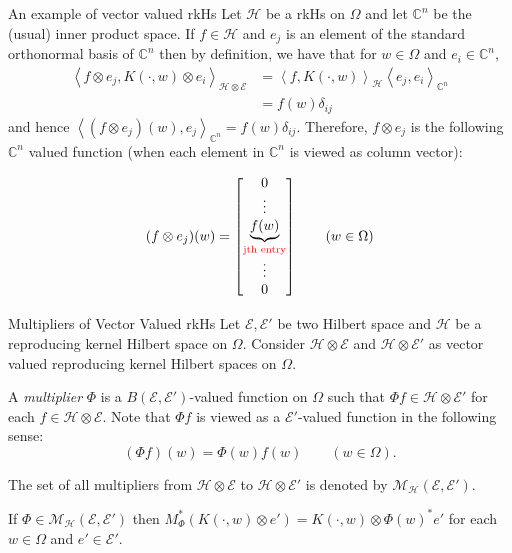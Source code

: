 \documentclass[handout]{beamer}
\newcommand{\C}{\mathbb C}
\newcommand{\calE}{{\mathcal E}}
\newcommand{\calH}{{\mathcal H}}
\newcommand{\calM}{{\mathcal M}}
\newcommand{\ip}[1]{\left\langle #1 \right\rangle}
\begin{document}
\begin{frame}{An example of vector valued rkHs}
Let $\calH$ be a rkHs on $\Omega$ and let $\C ^{n}$ be the (usual) inner product space.
\pause
If $f \in \calH$ and $e_{j}$ is an element of the standard orthonormal basis of $\C^{n}$ then by definition, we have that for $w \in \Omega$ and $e_{i} \in \C^{n}$,
\begin{align*}
\ip{f \otimes e_{j}, K\left( \cdot , w \right) \otimes e_{i}}_{\calH \otimes \calE} &= \ip{f, K\left( \cdot , w \right)}_{\calH} \ip{e_{j}, e_{i}}_{\C ^{n}} \\
&= f(w) \delta_{ij}
\end{align*}
and hence $\ip{(f\otimes e_{j})(w), e_{j}}_{\C ^{n}} = f(w)\delta_{ij}$. \pause Therefore, $f\otimes e_{j}$ is the following $\C^{n}$ valued function (when each element in $\C ^{n}$ is viewed as column vector):

\begin{equation*}
(f\otimes e_{j}) (w) = 
\begin{bmatrix}
0 \\
\vdots \\
\underbrace{f(w)}_{\textcolor{red}{\text{jth entry}}}\\
\vdots \\
0
\end{bmatrix} \qquad (w \in \Omega)
\end{equation*}
\end{frame}

\begin{frame}{Multipliers of Vector Valued rkHs}
Let $\calE, \calE'$ be two Hilbert space and $\calH$ be a reproducing kernel Hilbert space on $\Omega$. Consider $\calH \otimes \calE$ and $\calH \otimes \calE '$ as vector valued reproducing kernel Hilbert spaces on $\Omega$.

\pause

A \textit{multiplier} $\Phi$ is a $B\left( \calE , \calE' \right)$-valued function on $\Omega$ such that $\Phi f \in \calH \otimes \calE '$ for each $f \in \calH \otimes \calE$. Note that $\Phi f$ is viewed as a $\calE '$-valued function in the following sense:
\begin{equation*}
(\Phi f)(w) =  \Phi(w) f(w) \qquad (w \in \Omega).
\end{equation*}

The set of all multipliers from $\calH \otimes \calE$ to $\calH \otimes \calE'$ is denoted by $\calM _{\calH} \left( \calE , \calE' \right)$.

\pause

\begin{lemma}
If $\Phi \in \calM _{\calH} \left( \calE , \calE' \right)$ then $M_{\Phi}^{*} \left( K\left( \cdot , w \right) \otimes e' \right) = K\left( \cdot, w \right) \otimes \Phi(w) ^{*} e'$ for each $w\in \Omega$ and $e' \in \calE'$.
\end{lemma}
\end{frame}
\end{document}
